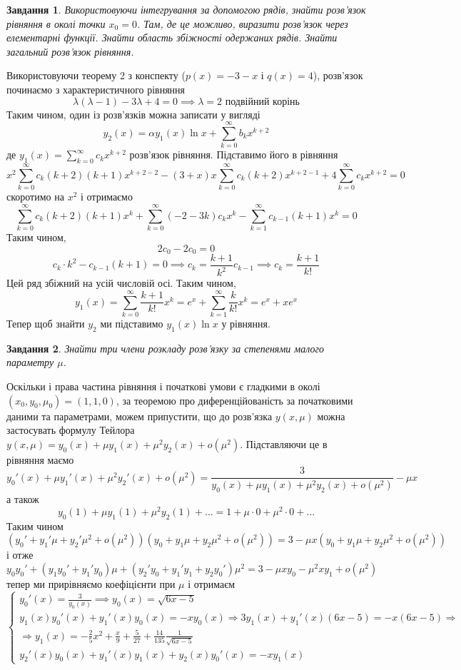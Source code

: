 \documentclass[12pt]{article} %
\newtheorem{prob}{Завдання}
\begin{document}
\begin{prob}Використовуючи інтегрування за допомогою рядів, знайти розв’язок рівняння в околі точки  $x_0=0$. Там, де це можливо,%
виразити розв’язок через елементарні функції. Знайти область збіжності одержаних рядів. Знайти загальний розв’язок рівняння.\end{prob}
Використовуючи теорему 2 з конспекту ($p(x)=-3-x$ і $q(x)=4$), розв’язок починаємо з характеристичного рівняння
\[\lambda(\lambda-1)-3\lambda +4=0\implies \lambda=2\mbox{ подвійний корінь}\]
Таким чином, один із розв’язків можна записати у вигляді
\[y_2(x)=\alpha y_1(x)\ln x+\sum_{k=0}^{\infty}b_kx^{k+2} \]
де $y_1(x)=\sum_{k=0}^{\infty}c_kx^{k+2}$ розв’язок рівняння. Підставимо його в рівняння
	\[x^2\sum_{k=0}^{\infty}c_k(k+2)(k+1)x^{k+2-2}-(3+x)x\sum_{k=0}^{\infty}c_k(k+2)x^{k+2-1}+
	4\sum_{k=0}^{\infty}c_kx^{k+2}=0\]
скоротимо на $x^2$ і отримаємо
\[\sum_{k=0}^{\infty}c_k(k+2)(k+1)x^k+\sum_{k=0}^{\infty}(-2-3k)c_kx^k-\sum_{k=1}^{\infty}c_{k-1}(k+1)x^k=0\]
Таким чином,
\[2c_0-2c_0=0\]
\[c_k\cdot k^2-c_{k-1}(k+1)=0\implies c_k=\frac{k+1}{k^2}c_{k-1}\implies c_k=\frac{k+1}{k!}\]
Цей ряд збіжний на усій числовій осі.
Таким чином,
\[y_1(x)=\sum_{k=0}^{\infty}\frac{k+1}{k!}x^k=e^x+\sum_{k=1}^{\infty}\frac{k}{k!}x^k=e^x+xe^x\]
Тепер щоб знайти $y_2$ ми підставимо $y_1(x)\ln x$ у рівняння.
\begin{prob}Знайти три члени розкладу розв’язку за степенями малого параметру $\mu$.\end{prob}
	Оскільки і права частина рівняння і початкові умови є гладкими в околі $(x_0,y_0,\mu_0)=(1,1,0)$, за теоремою
	про диференційованість за початковими даними та параметрами, можем припустити, що до розв’язка $y(x,\mu)$ можна застосувать
	формулу Тейлора $y(x,\mu)=y_0(x)+\mu y_1(x)+\mu^2y_2(x)+o(\mu^2)$. Підставляючи це в рівняння маємо
	\[y_0'(x)+\mu y_1'(x)+\mu^2y_2'(x)+o(\mu^2)=
	\frac{3}{y_0(x)+\mu y_1(x)+\mu^2y_2(x)+o(\mu^2)}-\mu x
	\]
	а також
	\[y_0(1)+\mu y_1(1)+\mu^2 y_2(1)+\dots=1+\mu\cdot 0+\mu^2\cdot0+\dots\]
	Таким чином
	\[(y_0'+y_1'\mu+y_2'\mu^2+o(\mu^2))(y_0+y_1\mu+y_2\mu^2+o(\mu^2))=3-\mu x(y_0+y_1\mu+y_2\mu^2+o(\mu^2))\]
	і отже
		\[y_0y_0'+(y_1y_0'+y_1'y_0)\mu+(y_2'y_0+y_1'y_1+y_2y_0')\mu^2=3-\mu xy_0-\mu^2xy_1+o(\mu^2)\]
	тепер ми прирівняємо коефіцієнти при $\mu$ і отримаєм
	\[\begin{cases}
		y_0'(x)=\frac{3}{y_0(x)}\implies y_0(x)=\sqrt{6x-5}\\
		y_1(x)y_0'(x)+y_1'(x)y_0(x)=-xy_0(x)\Rightarrow 3y_1(x)+y_1'(x)(6x-5)=-x(6x-5)\Rightarrow\\
		 \Rightarrow y_1(x)=-\frac{2}{5}x^2+\frac{x}{9}+\frac{5}{27}+\frac{14}{135}\frac{1}{\sqrt{6x-5}}\\
		y_2'(x)y_0(x)+y_1'(x)y_1(x)+y_2(x)y_0'(x)=-xy_1(x)
	\end{cases}
	\]
\end{document}

